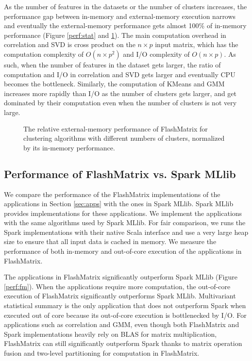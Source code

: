 As the number of features in the datasets or the number of clusters increases,
the performance gap between in-memory and external-memory execution
narrows and eventually the external-memory performance gets almost 100\%
of in-memory performance (Figure \ref{perf:stat} and \ref{perf:clust}).
The main computation overhead in correlation and SVD is cross product on
the $n \times p$ input matrix, which has the computation complexity of
$O(n \times p^2)$ and I/O complexity of $O(n \times p)$. As such, when
the number of features in the dataset gets larger, the ratio of computation
and I/O in correlation and SVD gets larger and eventually CPU becomes
the bottleneck. Similarly, the computation of KMeans and GMM increases
more rapidly than I/O as the number of clusters gets larger, and get
dominated by their computation even when the number of clusters is not
very large.

\begin{figure}
	\begin{center}
		\footnotesize
		
		\caption{The relative external-memory performance of FlashMatrix for
			clustering algorithms with different numbers of clusters, normalized
		by its in-memory performance.}
		\label{perf:clust}
	\end{center}
\end{figure}

\subsection{Performance of FlashMatrix vs. Spark MLlib}

We compare the performance of the FlashMatrix implementations of the applications
in Section \ref{sec:apps} with the ones in Spark MLlib. Spark MLlib provides
implementations for these applications. We implement the applications with
the same algorithms used by Spark MLlib. For fair comparison, we runs the Spark
implementations with their native Scala interface and use a very large heap size
to ensure that all input data is cached in memory. We measure the performance
of both in-memory and out-of-core execution of the applications in FlashMatrix.

The applications in FlashMatrix significantly outperform Spark MLlib (Figure
\ref{perf:fm}). When the applications require more computation, the out-of-core
execution of FlashMatrix significantly outperforms Spark MLlib. Multivariant
statistical summary is the only application that does not outperform Spark
when executed out of core because its out-of-core execution is bottlenecked
by I/O. For applications such as correlation and GMM, even though both FlashMatrix
and Spark implementations heavily rely on BLAS for matrix multiplication,
FlashMatrix can still significantly outperform Spark thanks to matrix operation
fusion and two-level partitioning for computation in FlashMatrix.


